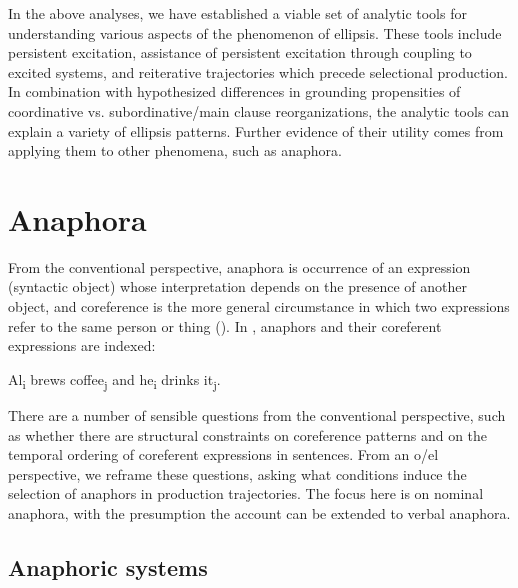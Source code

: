   In the above analyses, we have established a viable set of analytic tools for understanding various aspects of the phenomenon of ellipsis. These tools include persistent excitation, assistance of persistent excitation through coupling to excited systems, and reiterative trajectories which precede selectional production. In combination with hypothesized differences in grounding propensities of coordinative vs. subordinative/main clause reorganizations, the analytic tools can explain a variety of ellipsis patterns. Further evidence of their utility comes from applying them to other phenomena, such as anaphora.

\section{Anaphora}

From the conventional perspective, anaphora is occurrence of an expression (syntactic object) whose interpretation depends on the presence of another object, and coreference is the more general circumstance in which two expressions refer to the same person or thing (\citealt{HankamerSag1976,Huang2000,Reinhart1983,Reinhart2016,Safir2004}). In , anaphors and their coreferent expressions are indexed:

\ea\label{ex:7:9}
    {Al\textsubscript{i} brews coffee\textsubscript{j} and he\textsubscript{i} drinks it\textsubscript{j}}.
\z

  There are a number of sensible questions from the conventional perspective, such as whether there are structural constraints on coreference patterns and on the temporal ordering of coreferent expressions in sentences. From an o/el perspective, we reframe these questions, asking what conditions induce the selection of anaphors in production trajectories. The focus here is on nominal anaphora, with the presumption the account can be extended to verbal anaphora. 

\subsection{Anaphoric systems}

